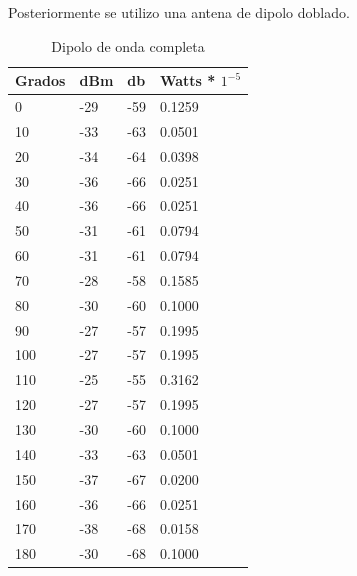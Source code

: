 \documentclass[12pt,letterpaper]{article}
\begin{document}
\newpage
Posteriormente se utilizo una antena de dipolo doblado.
\begin{table}[h]
    \centering
    \begin{tabular}{|l|l|l|l|}
    \hline
    Grados & dBm & db & Watts * $1^{-5}$ \\ \hline
    0 & -29 & -59 & 0.1259 \\ \hline
    10 & -33 & -63 & 0.0501 \\ \hline
    20 & -34 & -64 & 0.0398 \\ \hline
    30 & -36 & -66 & 0.0251 \\ \hline
    40 & -36 & -66 & 0.0251 \\ \hline
    50 & -31 & -61 & 0.0794 \\ \hline
    60 & -31 & -61 & 0.0794 \\ \hline
    70 & -28 & -58 & 0.1585 \\ \hline
    80 & -30 & -60 & 0.1000 \\ \hline
    90 & -27 & -57 & 0.1995 \\ \hline
    100 & -27 & -57 & 0.1995 \\ \hline
    110 & -25 & -55 & 0.3162 \\ \hline
    120 & -27 & -57 & 0.1995 \\ \hline
    130 & -30 & -60 & 0.1000 \\ \hline
    140 & -33 & -63 & 0.0501 \\ \hline
    150 & -37 & -67 & 0.0200 \\ \hline
    160 & -36 & -66 & 0.0251 \\ \hline
    170 & -38 & -68 & 0.0158 \\ \hline
    180 & -30 & -68 & 0.1000 \\ \hline
    \end{tabular}
    \caption{Dipolo de onda completa}
    \label{my-label}
\end{table}
\end{document}

